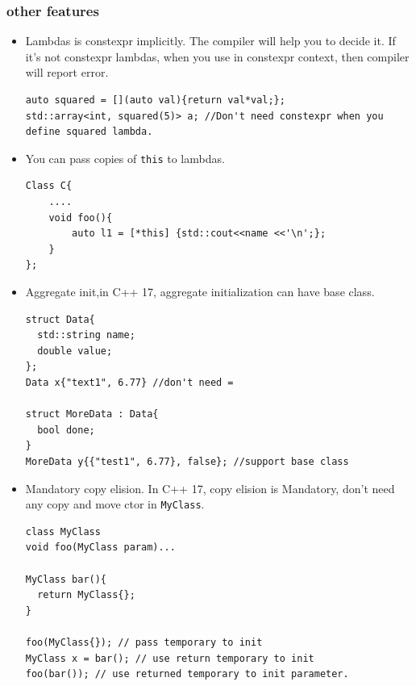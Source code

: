 \documentclass[a4paper,11pt,twoside]{book}
\begin{document}

\subsubsection{other features}
\begin{itemize}
	
	\item Lambdas is constexpr implicitly. The compiler will help you to decide it. If it's not constexpr lambdas, when you use in constexpr context, then compiler will report error. 
\begin{lstlisting}
auto squared = [](auto val){return val*val;};
std::array<int, squared(5)> a; //Don't need constexpr when you define squared lambda.	
\end{lstlisting}	
	
	\item You can pass copies of \texttt{this} to lambdas.
\begin{lstlisting}
Class C{
	....
	void foo(){
		auto l1 = [*this] {std::cout<<name <<'\n';};
	}
};	
\end{lstlisting}	
	
    \item Aggregate init,in C++ 17, aggregate initialization can have base class.
\begin{lstlisting}
struct Data{
  std::string name;
  double value;
};
Data x{"text1", 6.77} //don't need =

struct MoreData : Data{
  bool done;
}
MoreData y{{"test1", 6.77}, false}; //support base class
\end{lstlisting}

    \item Mandatory copy elision. In C++ 17, copy elision is Mandatory, don't need any copy and move ctor in \texttt{MyClass}.
\begin{lstlisting}
class MyClass
void foo(MyClass param)...

MyClass bar(){
  return MyClass{};
}

foo(MyClass{}); // pass temporary to init
MyClass x = bar(); // use return temporary to init
foo(bar()); // use returned temporary to init parameter.
\end{lstlisting}

\end{itemize}
\end{document}
